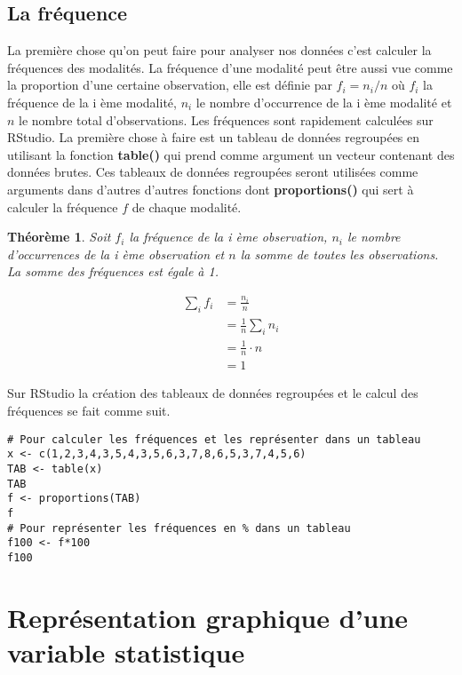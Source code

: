 \documentclass{report}
\newtheorem{theorem}{Théorème}
\begin{document}
\newpage

\subsection{La fréquence}

La première chose qu'on peut faire pour analyser nos données c'est calculer la fréquences des modalités. La fréquence d'une modalité peut être aussi vue comme la proportion d'une certaine observation, elle est définie par $f_i = n_i/n$ où $f_i$ la fréquence de la i ème modalité, $n_i$ le nombre d'occurrence de la i ème modalité et $n$ le nombre total d'observations. Les fréquences sont rapidement calculées sur RStudio. La première chose à faire est un tableau de données regroupées en utilisant la fonction \textbf{table()} qui prend comme argument un vecteur contenant des données brutes. Ces tableaux de données regroupées seront utilisées comme arguments dans d'autres d'autres fonctions dont \textbf{proportions()} qui sert à calculer la fréquence $f$ de chaque modalité. 

\begin{theorem}
Soit $f_i$ la fréquence de la i ème observation, $n_i$ le nombre d'occurrences de la i ème observation et $n$ la somme de toutes les observations. La somme des fréquences est égale à 1.

\begin{align*}
  \sum_{i} f_i &= \frac{n_i}{n} \\
 &=  \frac{1}{n}  \sum_{i} n_i \\
 &= \frac{1}{n} \cdot n \\
 &= 1
\end{align*}
\end{theorem}

Sur RStudio la création des tableaux de données regroupées et le calcul des fréquences se fait comme suit.

\begin{verbatim}
# Pour calculer les fréquences et les représenter dans un tableau
x <- c(1,2,3,4,3,5,4,3,5,6,3,7,8,6,5,3,7,4,5,6)
TAB <- table(x)
TAB
f <- proportions(TAB)
f
# Pour représenter les fréquences en % dans un tableau
f100 <- f*100
f100
\end{verbatim}

\section{Représentation graphique d’une variable statistique}
\end{document}
